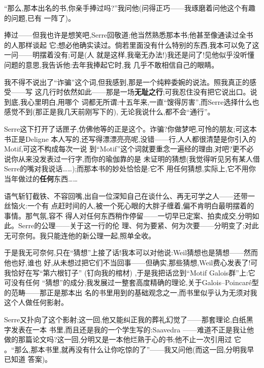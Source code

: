 “那么,那本出名的书,你亲手捧过吗?”我问他(问得正巧——我琢磨着问他这个有趣的问题,已有
一阵了)。

捧过——但我也许是想笑吧,Serre回敬道;他当然熟悉那本书;他甚至像通读过全书的人那样谈起
它;想必他确实读过。倘若里面没有什么特别的东西,我本可以免了这一问——明摆着没有;可是(人
就是这样,我毫无办法!)我还是问了!见他似乎没听懂问题的意思,我告诉他:去年我捧起它时,我
几乎不敢相信自己的眼睛。

\pmark 我不得不说出了“诈骗”这个词,但我感到,那是一个纯粹委婉的说法。照我真正的感受——写
这几行时依然如此——那是一场\textbf{无耻之行};可我忍住没有把它说出口。说到底,我心里明白,用哪个
词都无所谓:十五年来,一直“馊得厉害”,而Serre选择什么也感觉不到(那正是我几天前刚写下的),
无论我说什么,都不会“通行”。

Serre这下打开了话匣子,仿佛他等的正是这个。诈骗?你做梦吧,可怜的朋友;可这本书正是Deligne
本人写的,还写得漂漂亮亮呢,没错——行,人人都很清楚是你引入的 Motif,可这不构成每次一说
到“Motif”这个词就要重念一遍经的理由,对吧?更不必说你从来没发表过一行字,而你的瑜伽靠的是
未证明的猜想(我觉得听见另有某人借Serre的嘴对我说话……);而那本书的妙处恰恰是:它不
用任何猜想,实际上,它不用你当年做过的\textbf{任何}东西……

语气斩钉截铁、不容回嘴,出自一位深知自己在谈什么、再无可学之人——还带一丝恼火:一个有
点赶时间的人,被一个死心眼的大胖子缠着,偏\dmark{}不肯明白最明摆着的事情。那气氛,容不
得人对任何东西稍作停留——一切早已定案、拍卖成交,分明如此。Serre的公理——关于这一行的伦
理、何为要紧、何为次要——分明变了;对此无可奈何。我只能连他的新公理一起,照单全收。

于是我无可奈何,只在“猜想”上接了话!我本可以对他说:Weil猜想也是猜想——然而他也好,谁也
好,从未想过把它们不当回事——但确实,那些猜想,Weil费心发表了!可我恰好在写“第六根钉子”
(钉向我的棺材)
,于是我把话岔到“Motif Galois群”上:它可没有任何
“猜想”的成分;我发展过一整套高度精确的理论,关于Galois--Poincaré型的范畴——那正是那本出
名的书里用到的基础观念之一,而书里似乎认为无须对我这个人做任何影射。

Serre又扑向了这个影射;这一回,他又能纠正我的葬礼幻觉了——那套理论,白纸黑字发表在一本
书里,而且还是我的一个学生写的:Saavedra
——难道不正是我让他做的那篇论文吗?这一回,分明又是一本他烂熟于心的书;他不止一次引用过
它
。“那么,那本书里,就再没有什么让你吃惊的了”——我又问他(而这一回,分明我早已知道
答案)。

